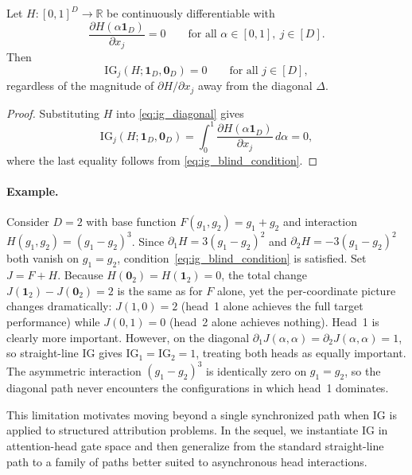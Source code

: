     \begin{theorem}
    \label{thm:diag_blind}
    Let $H:[0,1]^D\to\mathbb{R}$ be continuously differentiable with
    \begin{equation}
        \frac{\partial H(\alpha\mathbf{1}_D)}{\partial x_j}=0
        \qquad
        \text{for all }\alpha\in[0,1],\ j\in[D].
        \label{eq:ig_blind_condition}
    \end{equation}
    Then
    \begin{equation}
        \mathrm{IG}_j(H;\mathbf{1}_D,\mathbf{0}_D)
        =0
        \qquad
        \text{for all }j\in[D],
        \label{eq:ig_blind_result}
    \end{equation}
    regardless of the magnitude of $\partial H/\partial x_j$ away from the diagonal $\Delta$.
    \end{theorem}

    \begin{proof}
    Substituting $H$ into \eqref{eq:ig_diagonal} gives
    \[
    \mathrm{IG}_j(H;\mathbf{1}_D,\mathbf{0}_D)
    =
    \int_0^1 \frac{\partial H(\alpha\mathbf{1}_D)}{\partial x_j}\,d\alpha
    =0,
    \]
    where the last equality follows from \eqref{eq:ig_blind_condition}.
    \end{proof}

    \paragraph{Example.}
    Consider $D=2$ with base function $F(g_1,g_2)=g_1+g_2$ and interaction $H(g_1,g_2)=(g_1-g_2)^3$. Since $\partial_1 H=3(g_1-g_2)^2$ and $\partial_2 H=-3(g_1-g_2)^2$ both vanish on $g_1=g_2$, condition~\eqref{eq:ig_blind_condition} is satisfied. Set $J=F+H$. Because $H(\mathbf{0}_2)=H(\mathbf{1}_2)=0$, the total change $J(\mathbf{1}_2)-J(\mathbf{0}_2)=2$ is the same as for $F$ alone, yet the per-coordinate picture changes dramatically: $J(1,0)=2$ (head~1 alone achieves the full target performance) while $J(0,1)=0$ (head~2 alone achieves nothing). Head~1 is clearly more important. However, on the diagonal $\partial_1 J(\alpha,\alpha)=\partial_2 J(\alpha,\alpha)=1$, so straight-line IG gives $\mathrm{IG}_1=\mathrm{IG}_2=1$, treating both heads as equally important. The asymmetric interaction $(g_1-g_2)^3$ is identically zero on $g_1=g_2$, so the diagonal path never encounters the configurations in which head~1 dominates.

    This limitation motivates moving beyond a single synchronized path when IG is applied to structured attribution problems. In the sequel, we instantiate IG in attention-head gate space and then generalize from the standard straight-line path to a family of paths better suited to asynchronous head interactions.